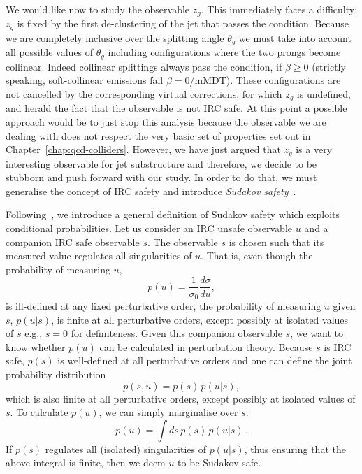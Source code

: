 We would like now to study the observable $z_g$. This immediately
faces a difficulty: $z_g$ is fixed by the first de-clustering of the
jet that passes the \SD condition. Because we are completely inclusive
over the splitting angle $\theta_g$ we must take into account all
possible values of $\theta_g$ including configurations where the two
prongs become collinear. Indeed collinear splittings always pass the
\SD condition, if $\beta \ge 0$ (strictly speaking, soft-collinear
emissions fail \SD $\beta=0$/mMDT). These configurations are not
cancelled by the corresponding virtual corrections, for which $z_g$ is
undefined, and herald the fact that the observable is not IRC safe.
%
At this point a possible approach would be to just stop this analysis because the observable we are dealing with does not respect the very basic set of properties set out in Chapter~\ref{chap:qcd-colliders}. However, we have just argued that $z_g$ is a very interesting observable for jet substructure and therefore, we decide to be stubborn and push forward with our study. In order to do that, we must generalise the concept of IRC safety and introduce \emph{Sudakov safety}~\cite{Larkoski:2013paa}.
 
 Following~\cite{Larkoski:2015lea}, we introduce a general definition of Sudakov safety which exploits conditional probabilities.
Let us consider an IRC unsafe observable $u$ and a companion IRC safe observable $s$.  The observable $s$ is chosen such that its measured value regulates all singularities of $u$.  That is, even though the probability of measuring $u$,
\begin{equation}
p(u) = \frac{1}{\sigma_0} \frac{d \sigma}{d u},
\end{equation}
is ill-defined at any fixed perturbative order, the probability of measuring $u$ given $s$, $p(u|s)$, is finite at all perturbative orders, except possibly at isolated values of $s$ e.g., $s=0$ for definiteness.  Given this companion observable $s$, we want to know whether $p(u)$ can be calculated in perturbation theory.
%
Because $s$ is IRC safe, $p(s)$ is well-defined at all perturbative
orders and one can define the joint probability distribution
%
\begin{equation}\label{eq:cond_prob}
p(s,u) = p(s)\, p(u|s) ,
\end{equation}
%
which is also finite at all perturbative orders, except possibly at isolated values of $s$.  To calculate $p(u)$, we can simply marginalise over $s$:
%
\begin{equation}
\label{eq:sudsafeone}
p(u) = \int d s\, p(s) \, p(u|s) \,.
\end{equation}
%
If $p(s)$ regulates all (isolated) singularities of $p(u|s)$, thus ensuring that the above integral is finite, then we deem $u$ to be Sudakov safe.

